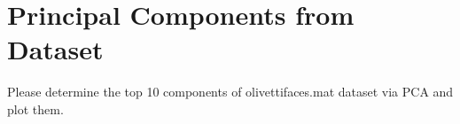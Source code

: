 \documentclass[11pt]{article}
\newcommand{\mtx}[1]{\mathbf{#1}}
\newcommand{\vct}[1]{\mathbf{#1}}
\def \mU {\mtx{U}}
\def \mS {\mtx{S}}
\def \mX {\mtx{X}}
\def \vu {\vct{u}}
\begin{document}
\newpage
\section*{Principal Components from Dataset}
Please determine the top 10 components of olivettifaces.mat dataset via  PCA and plot them.
 \newpage
\end{document}
